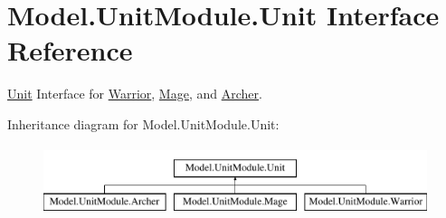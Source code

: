 \hypertarget{interface_model_1_1_unit_module_1_1_unit}{}\section{Model.\+Unit\+Module.\+Unit Interface Reference}
\label{interface_model_1_1_unit_module_1_1_unit}


\hyperlink{interface_model_1_1_unit_module_1_1_unit}{Unit} Interface for \hyperlink{class_model_1_1_unit_module_1_1_warrior}{Warrior}, \hyperlink{class_model_1_1_unit_module_1_1_mage}{Mage}, and \hyperlink{class_model_1_1_unit_module_1_1_archer}{Archer}.  


Inheritance diagram for Model.\+Unit\+Module.\+Unit\+:\begin{figure}[H]
\begin{center}
\leavevmode
\includegraphics[height=2.000000cm]{interface_model_1_1_unit_module_1_1_unit}
\end{center}
\end{figure}
